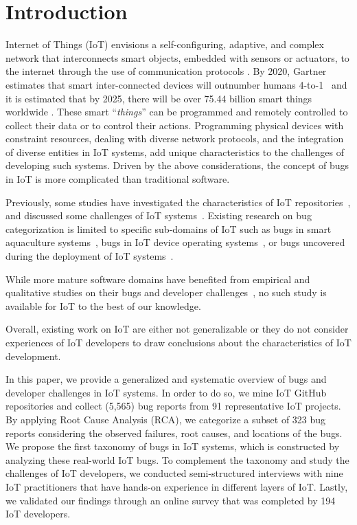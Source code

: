 
\chapter{Introduction}
\label{ch:Introduction}

Internet of Things (IoT) envisions a self-configuring, adaptive, and complex network that interconnects smart objects, embedded with sensors or actuators, to the internet through the use of communication protocols \cite{towardsIoTDefinition}. By 2020, Gartner estimates that smart inter-connected devices will outnumber humans 4-to-1~\cite{hung2017leading} and it is estimated that by 2025, there will be over 75.44 billion smart things worldwide \cite{statista2018internet}. These smart ``\emph{things}'' can be programmed and remotely controlled to collect their data or to control their actions. Programming physical devices with constraint resources, dealing with diverse network protocols, and the integration of diverse entities in IoT systems, add unique characteristics to the challenges of developing such systems. Driven by the above considerations, the concept of bugs in IoT is more complicated than traditional software.

Previously, some studies have investigated the characteristics of IoT repositories~\cite{IoTOSS2020}, and discussed some challenges of IoT systems~\cite{hnat2011hitchhiker,corno2019challenges,stojkoska2017review}.
Existing research on bug categorization is limited to specific sub-domains of IoT such as bugs in smart aquaculture systems~\cite{chen2017application}, bugs in IoT device operating systems~\cite{IoTOSBugs}, or bugs uncovered during the deployment of IoT systems~\cite{hnat2011hitchhiker}. 

While more mature software domains have benefited from empirical and qualitative studies on their bugs and developer challenges~\cite{DlTaxFaults,blockChainBugs,joorabchi2013real}, no such study is available for IoT to the best of our knowledge. 

Overall, existing work on IoT are either not generalizable or they do not consider experiences of IoT developers to draw conclusions about the characteristics of IoT development.

In this paper, we provide a generalized and systematic overview of bugs and developer challenges in IoT systems. In order to do so, we mine IoT GitHub repositories and collect (5,565) bug reports from 91 representative IoT projects. By applying Root Cause Analysis (RCA), we categorize a subset of 323 bug reports considering the observed failures, root causes, and locations of the bugs. We propose the first taxonomy of bugs in IoT systems, which is constructed by analyzing these real-world IoT bugs. To complement the taxonomy and study the challenges of IoT developers, we conducted semi-structured interviews with nine IoT practitioners that have hands-on experience in different layers of IoT. Lastly, we validated our findings through an online survey that was completed by 194 IoT developers.

